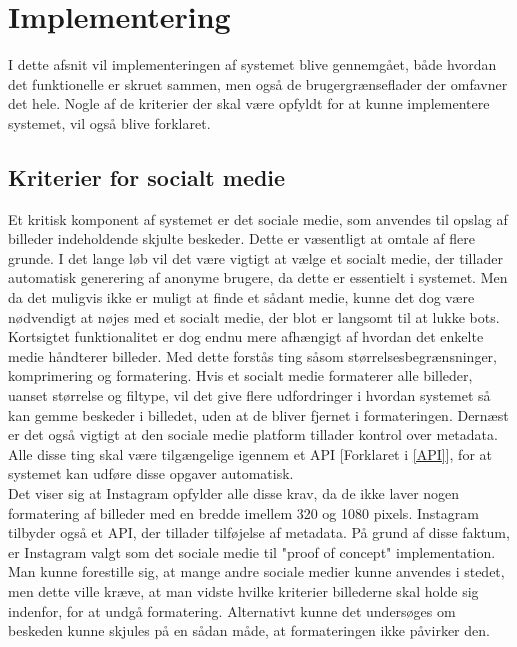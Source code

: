 \section{Implementering}
I dette afsnit vil implementeringen af systemet blive gennemgået, både hvordan det funktionelle er skruet sammen, men også de brugergrænseflader der omfavner det hele. Nogle af de kriterier der skal være opfyldt for at kunne implementere systemet, vil også blive forklaret.

\subsection{Kriterier for socialt medie}
\label{Kriterier_Medie}
Et kritisk komponent af systemet er det sociale medie, som anvendes til opslag af billeder indeholdende skjulte beskeder. Dette er væsentligt at omtale af flere grunde. I det lange løb vil det være vigtigt at vælge et socialt medie, der tillader automatisk generering af anonyme brugere, da dette er essentielt i systemet. Men da det muligvis ikke er muligt at finde et sådant medie, kunne det dog være nødvendigt at nøjes med et socialt medie, der blot er langsomt til at lukke bots. Kortsigtet funktionalitet er dog endnu mere afhængigt af hvordan det enkelte medie håndterer billeder. Med dette forstås ting såsom størrelsesbegrænsninger, komprimering og formatering. Hvis et socialt medie formaterer alle billeder, uanset størrelse og filtype, vil det give flere udfordringer i hvordan systemet så kan gemme beskeder i billedet, uden at de bliver fjernet i formateringen. Dernæst er det også vigtigt at den sociale medie platform tillader kontrol over metadata. Alle disse ting skal være tilgængelige igennem et API [Forklaret i \ref{API}], for at systemet kan udføre disse opgaver automatisk.\\
Det viser sig at Instagram opfylder alle disse krav, da de ikke laver nogen formatering af billeder med en bredde imellem 320 og 1080 pixels.\cite{Instagram_Photo_Resolution}\cite{Instagram_Image_Compression} Instagram tilbyder også et API, der tillader tilføjelse af metadata. På grund af disse faktum, er Instagram valgt som det sociale medie til "proof of concept" implementation. Man kunne forestille sig, at mange andre sociale medier kunne anvendes i stedet, men dette ville kræve, at man vidste hvilke kriterier billederne skal holde sig indenfor, for at undgå formatering. Alternativt kunne det undersøges om beskeden kunne skjules på en sådan måde, at formateringen ikke påvirker den. 
\newpage

